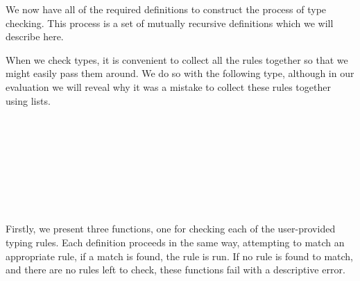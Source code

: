 We now have all of the required definitions to construct the process of
type checking. This process is a set of mutually recursive definitions which
we will describe here.

When we check types, it is convenient to collect all the rules together so
that we might easily pass them around. We do so with the following type, although
in our evaluation we will reveal why it was a mistake to collect these rules
together using lists.

\begin{code}%
\>[0]\AgdaSpace{}%
\AgdaSpace{}%
\AgdaSymbol{:}\AgdaSpace{}%
\AgdaSpace{}%
\<%
\\
\>[0][@{}l@{\AgdaIndent{0}}]%
\>[2]\AgdaSpace{}%
\AgdaSymbol{:}%
\>[113I]\AgdaSpace{}%
%
\>[22]\<%
\\
\>[.][@{}l@{}]\<[113I]%
\>[7]\AgdaSpace{}%
%
\>[22]\<%
\\
%
\>[7]\AgdaSpace{}%
%
\>[22]\<%
\\
%
\>[7]\AgdaSpace{}%
%
\>[22]\<%
\\
%
\>[7]\AgdaSpace{}%
%
\>[22]\<%
\\
%
\>[7]\AgdaSpace{}%
%
\>[22]\<%
\\
%
\>[7]\<%
\end{code}

Firstly, we present three functions, one for checking each of the user-provided
typing rules. Each definition proceeds in the same way,
attempting to match an appropriate rule, if a match is found, the rule is
run. If no rule is found to match, and there are no rules left to check,
these functions fail with a descriptive error.

